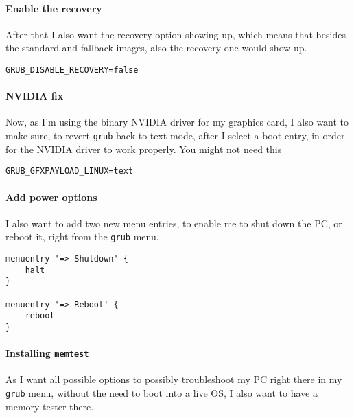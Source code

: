 \documentclass[9pt]{report}
\begin{document}
\vfill\eject

\hypertarget{x-enable-the-recovery}{\paragraph{Enable the recovery}}
After that I also want the recovery option showing up, which means that besides the standard and fallback images, also the recovery one would show up.


\begin{verbatim}
GRUB_DISABLE_RECOVERY=false
\end{verbatim}


\vfill\eject

\hypertarget{x-nvidia-fix}{\paragraph{NVIDIA fix}}
Now, as I’m using the binary NVIDIA driver for my graphics card, I also want to make sure, to revert \texttt{grub} back to text mode, after I select a boot entry, in order for the NVIDIA driver to work properly.
You might not need this


\begin{verbatim}
GRUB_GFXPAYLOAD_LINUX=text
\end{verbatim}


\vfill\eject

\hypertarget{x-add-power-options}{\paragraph{Add power options}}
I also want to add two new menu entries, to enable me to shut down the PC, or reboot it, right from the \texttt{grub} menu.


\begin{verbatim}
menuentry '=> Shutdown' {
    halt
}

menuentry '=> Reboot' {
    reboot
}
\end{verbatim}


\vfill\eject

\hypertarget{x-installing-memtest}{\paragraph{Installing \texttt{memtest}}}
As I want all possible options to possibly troubleshoot my PC right there in my \texttt{grub} menu,  without the need to boot into a live OS, I also want to have a memory tester there.
\end{document}
